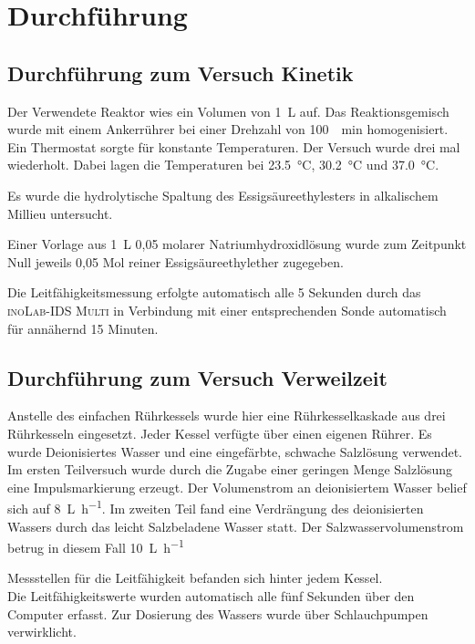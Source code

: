 \section{Durchführung}
\label{sec:durchfuerung}

\subsection{Durchführung zum Versuch Kinetik}
Der Verwendete Reaktor wies ein Volumen von \SI{1}{\liter} auf. Das Reaktionsgemisch wurde mit einem Ankerrührer bei einer Drehzahl von \SI{100}{\per\minute} homogenisiert. Ein Thermostat sorgte für konstante Temperaturen. 
Der Versuch wurde drei mal wiederholt. Dabei lagen die Temperaturen bei \SI{23,5}{\degreeCelsius}, \SI{30,2}{\degreeCelsius} und \SI{37,0}{\degreeCelsius}.

Es wurde die hydrolytische Spaltung des Essigsäureethylesters in alkalischem Millieu untersucht. 

Einer Vorlage aus \SI{1}{\liter} 0,05 molarer Natriumhydroxidlösung wurde zum Zeitpunkt Null jeweils 0,05 Mol reiner Essigsäureethylether zugegeben.   

Die Leitfähigkeitsmessung erfolgte automatisch alle 5 Sekunden durch das \textsc{inoLab-IDS Multi} in Verbindung mit einer entsprechenden Sonde automatisch für annähernd 15 Minuten.

\subsection{Durchführung zum Versuch Verweilzeit}

Anstelle des einfachen Rührkessels wurde hier eine Rührkesselkaskade aus drei Rührkesseln eingesetzt. Jeder Kessel verfügte über einen eigenen Rührer. Es wurde Deionisiertes Wasser und eine eingefärbte, schwache Salzlösung verwendet. 
Im ersten Teilversuch wurde durch die Zugabe einer geringen Menge Salzlösung eine Impulsmarkierung erzeugt.  
Der Volumenstrom an deionisiertem Wasser belief sich auf \SI{8}{\liter\per\hour}.\linebreak
Im zweiten Teil fand eine Verdrängung des deionisierten Wassers durch das leicht Salzbeladene Wasser statt. Der Salzwasservolumenstrom betrug in diesem Fall \SI{10}{\liter\per\hour} 

Messstellen für die Leitfähigkeit befanden sich hinter jedem Kessel. \\Die Leitfähigkeitswerte wurden automatisch alle fünf Sekunden über den Computer erfasst.
Zur Dosierung des Wassers wurde über Schlauchpumpen verwirklicht.
